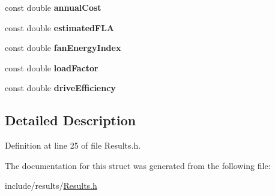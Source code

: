 \begin{DoxyCompactItemize}
const double {\bfseries annual\+Cost}
\item 
\mbox{\label{struct_fan_result_1_1_output_a87dc83a57a717ae2c7071cbe60459960}} 
const double {\bfseries estimated\+F\+LA}
\item 
\mbox{\label{struct_fan_result_1_1_output_a4ecd26ce3f950d847f562bbc709af587}} 
const double {\bfseries fan\+Energy\+Index}
\item 
\mbox{\label{struct_fan_result_1_1_output_af69651dbc14072bec6c9f009193c62fa}} 
const double {\bfseries load\+Factor}
\item 
\mbox{\label{struct_fan_result_1_1_output_ab810ca79692a37edee5d97ff578e994d}} 
const double {\bfseries drive\+Efficiency}
\end{DoxyCompactItemize}


\subsection{Detailed Description}


Definition at line 25 of file Results.\+h.



The documentation for this struct was generated from the following file\+:\begin{DoxyCompactItemize}
\item 
include/results/\hyperlink{_results_8h}{Results.\+h}\end{DoxyCompactItemize}
